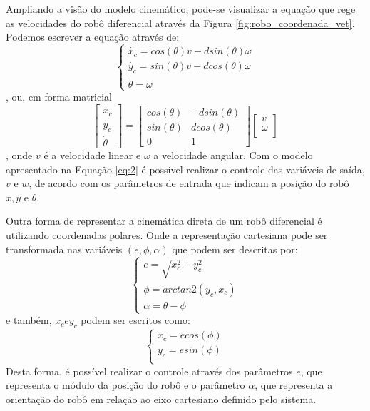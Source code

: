 Ampliando a visão do modelo cinemático, pode-se visualizar a equação que rege as velocidades do robô diferencial através da Figura \ref{fig:robo_coordenada_vet}. Podemos escrever a equação através de:
\begin{equation}
  \begin{cases}
     \dot{x_{c}} = cos(\theta)v - dsin(\theta)\omega\\
     \dot{y_{c}} = sin(\theta)v + dcos(\theta)\omega\\
     \dot{\theta} = \omega
  \end{cases}
  \label{eq:1}
\end{equation},
ou, em forma matricial
\begin{equation}
    \begin{bmatrix}
       \dot{x_{c}} \\
       \dot{y_{c}} \\
       \dot{\theta}
     \end{bmatrix} = \begin{bmatrix}
       cos(\theta) & -dsin(\theta)\\
        sin(\theta) & dcos(\theta)\\
       0 & 1
     \end{bmatrix}\begin{bmatrix}
       v\\
       \omega\\
     \end{bmatrix}
     \label{eq:2}
\end{equation},
onde $v$ é a velocidade linear e $\omega$ a velocidade angular. \cite{sousa2003controle}
Com o modelo apresentado na Equação \ref{eq:2} é possível realizar o controle das variáveis de saída, $v$ e $w$, de acordo com os parâmetros de entrada que indicam a posição do robô $x, y$ e $\theta$.
\par
Outra forma de representar a cinemática direta de um robô diferencial é utilizando coordenadas polares. \cite{aicardi1995closed} Onde a representação cartesiana pode ser transformada nas variáveis $(e, \phi, \alpha)$ que podem ser descritas por:
\begin{equation}
  \begin{cases}
     e = \sqrt{x_{c}^2 + y_{c}^2}\\
     \phi = arctan2(y_{c},x_{c})\\
     \alpha = \theta - \phi
  \end{cases}
  \label{eq:3}
\end{equation}
e também, $x_{c} e y_{c}$ podem ser escritos como:
\begin{equation}
  \begin{cases}
     x_{c} = e cos(\phi)\\
     y_{c} = esin(\phi)\\
  \end{cases}
  \label{eq:4}
\end{equation}
Desta forma, é possível realizar o controle através dos parâmetros $e$, que representa o módulo da posição do robô e o parâmetro $\alpha$, que representa a orientação do robô em relação ao eixo cartesiano definido pelo sistema.
